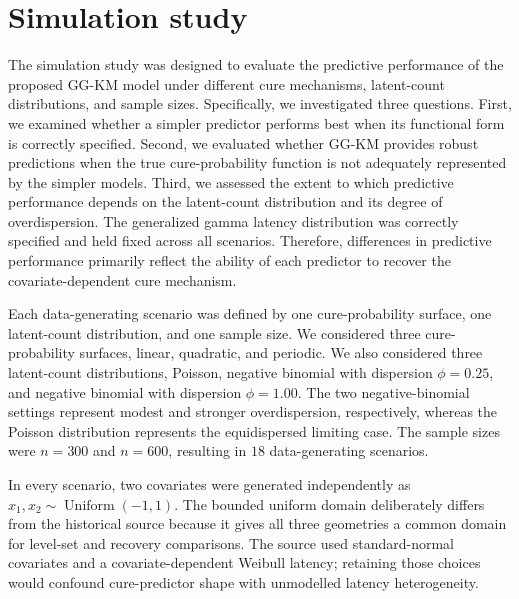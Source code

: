 \section{Simulation study}\label{sec:simulation}

The simulation study was designed to evaluate the predictive performance
of the proposed GG-KM model under different cure mechanisms, latent-count
distributions, and sample sizes. Specifically, we investigated three
questions. First, we examined whether a simpler predictor performs best
when its functional form is correctly specified. Second, we evaluated
whether GG-KM provides robust predictions when the true cure-probability
function is not adequately represented by the simpler models. Third, we
assessed the extent to which predictive performance depends on the
latent-count distribution and its degree of overdispersion. The
generalized gamma latency distribution was correctly specified and held
fixed across all scenarios. Therefore, differences in predictive
performance primarily reflect the ability of each predictor to recover
the covariate-dependent cure mechanism.

Each data-generating scenario was defined by one cure-probability surface,
one latent-count distribution, and one sample size. We considered three
cure-probability surfaces, linear, quadratic, and periodic. We also
considered three latent-count distributions, Poisson, negative binomial
with dispersion $\phi=0.25$, and negative binomial with dispersion
$\phi=1.00$. The two negative-binomial settings represent modest and
stronger overdispersion, respectively, whereas the Poisson distribution
represents the equidispersed limiting case. The sample sizes were
$n=300$ and $n=600$, resulting in $18$ data-generating scenarios.

In every scenario, two covariates were generated independently as
$x_1,x_2\sim\operatorname{Uniform}(-1,1)$. The bounded uniform domain
deliberately differs from the historical source because it gives all
three geometries a common domain for level-set and recovery comparisons.
The source used standard-normal covariates and a covariate-dependent
Weibull latency; retaining those choices would confound cure-predictor
shape with unmodelled latency heterogeneity.

